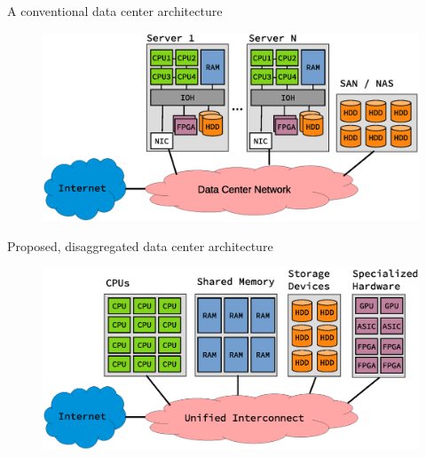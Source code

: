 \begin{frame}

A conventional data center architecture
\begin{figure}
	\centering
\includegraphics[scale=0.5]{./background/dc_architectures_conventional.eps}

\end{figure}

\end{frame}


\begin{frame}
Proposed, disaggregated data center architecture
\begin{figure}
	\centering
\includegraphics[scale=0.5]{./background/dc_architectures_disaggregated.eps}
\end{figure}
\end{frame}


